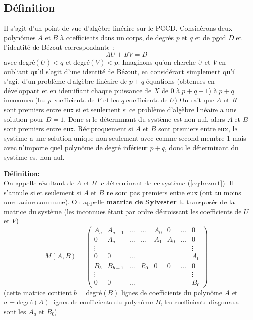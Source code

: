 \documentclass[a4paper,11pt]{article}
\begin{document}
\begin{giacjshere}
\subsection{D\'efinition}
Il s'agit d'un point de vue d'algèbre linéaire sur le PGCD. Considérons
deux polynômes $A$ et $B$ \`a coefficients dans un corps,
de degrés $p$ et $q$ et de pgcd $D$ et 
l'identité de Bézout correspondante~:
\begin{equation} \label{eq:bezout}
 A U + B V =D
\end{equation}
avec degré$(U)<q$ et degré$(V)<p$.
Imaginons qu'on cherche $U$ et $V$ en oubliant qu'il s'agit d'une
identité de Bézout, en considérant simplement qu'il s'agit d'un
problème d'algèbre linéaire de $p+q$ équations (obtenues en développant
et en identifiant chaque puissance de $X$ de 0 à $p+q-1$) 
à $p+q$ inconnues (les $p$ coefficients de $V$ et les $q$ coefficients de $U$)
On sait que $A$ et $B$ sont premiers entre eux si et seulement si ce problème
d'algèbre linéaire a une solution pour $D=1$. Donc si le déterminant
du système est non nul, alors $A$ et $B$ sont premiers entre eux.
Réciproquement si $A$ et $B$ sont premiers entre eux, le système a
une solution unique non seulement avec comme second membre $1$ mais avec
n'importe quel polynôme de degré inférieur $p+q$, donc le
déterminant du système est non nul.

{\bf Définition:} \\
On appelle résultant de $A$ et $B$ le déterminant de ce système 
(\ref{eq:bezout}). Il s'annule si et seulement si $A$ et $B$
ne sont pas premiers entre eux (ont au moins une racine commune).
On appelle {\bf matrice de Sylvester} la transposée de la matrice du système
(les inconnues étant par ordre décroissant les coefficients de $U$
et $V$)
\[ M(A,B)=\left( \begin{array}{cccccccc}
A_a   & A_{a-1} & \ldots & \ldots & A_0 & 0   & \ldots & 0 \\
0     & A_a     & \ldots & \ldots & A_1 & A_0 & \ldots & 0 \\
\vdots &        &        &      &     &  &      & \vdots \\
0     & 0       & \ldots &     &     &    &    & A_0 \\
B_b   & B_{b-1} & \ldots & B_0  & 0 &  0 & \ldots & 0 \\
\vdots &        &        &      &     &    &    & \vdots \\
0     &   0     & \ldots &    &      &     &   & B_0 
\end{array}
\right) \]
(cette matrice contient $b=$degré$(B)$ lignes de coefficients
du polynôme $A$ et $a=$degré$(A)$ lignes de coefficients du
polynôme $B$, les coefficients diagonaux sont les $A_a$ et $B_0$)


\end{giacjshere}
\end{document}
